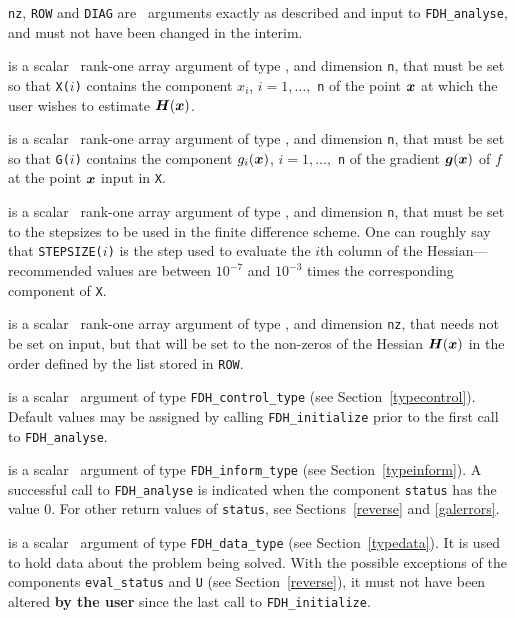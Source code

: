 \documentclass{galahad}
\newcommand{\packagename}{FDH}
\begin{document}
\vspace*{-2mm}
\begin{description}
 {\tt nz}, {\tt ROW} and {\tt DIAG} are  \intentin\ arguments 
exactly as described and input to {\tt \packagename\_analyse},
and must not have been changed in the interim.

 is a scalar \intentin\ rank-one array argument of type 
\realdp, and dimension {\tt n}, that  must be set so that
{\tt X(}$i${\tt)} contains the component $x_i$, $i = 1, \ldots,$ {\tt n} 
of the point ${\bm{x}}$ at which the user wishes to estimate ${\bm{H}}({\bm{x}})$.

 is a scalar \intentin\ rank-one array argument of type 
\realdp, and dimension {\tt n}, that must be set so that
{\tt G(}$i${\tt)} contains the component $g_i({\bm{x}})$, $i = 1, \ldots,$ {\tt n} 
of the gradient ${\bm{g}}({\bm{x}})$ of $f$ at the point ${\bm{x}}$ input in {\tt X}.

 is a scalar \intentin\ rank-one array argument of type 
\realdp, and dimension {\tt n}, that must be set to the stepsizes
to be used in the finite difference scheme.  One can roughly say that 
{\tt STEPSIZE(}$i${\tt)} is the step used to evaluate the $i$th column 
of the Hessian---recommended values are between $10^{-7}$ and $10^{-3}$
times the corresponding  component of {\tt X}.

 is a scalar \intentinout\ rank-one array argument of type 
\realdp, and dimension {\tt nz}, that needs not be set on input,
but that will be set to the non-zeros of the Hessian ${\bm{H}}({\bm{x}})$ in the
order defined by the list stored in {\tt ROW}.

 is a scalar \intentin\ argument of type 
{\tt \packagename\_control\_type}
(see Section~\ref{typecontrol}). Default values may be assigned by calling 
{\tt \packagename\_initialize} prior to the first call to 
{\tt \packagename\_analyse}. 

 is a scalar \intentinout\ argument of type 
{\tt \packagename\_inform\_type}
(see Section~\ref{typeinform}). 
A successful call to
{\tt \packagename\_analyse}
is indicated when the  component {\tt status} has the value 0. 
For other return values of {\tt status}, see Sections~\ref{reverse} and
\ref{galerrors}.

 is a scalar \intentinout\ argument of type 
{\tt \packagename\_data\_type}
(see Section~\ref{typedata}). It is used to hold data about the problem being 
solved. With the possible exceptions of the components 
{\tt eval\_status} and {\tt U} (see Section~\ref{reverse}), 
it must not have been altered {\bf by the user} since the last call to 
{\tt \packagename\_initialize}.


\end{description}
\end{document}
